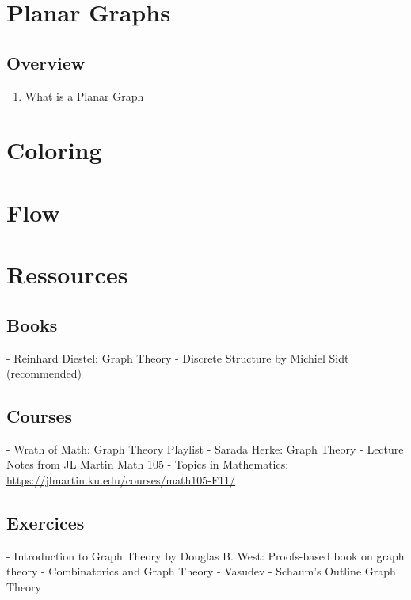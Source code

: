 \documentclass{article}
\begin{document}
\section{Planar Graphs}

\subsection{Overview}%
\label{sub:Overview}

\begin{enumerate}
    \item What is a Planar Graph
\end{enumerate}

\section{Coloring}
\section{Flow}

\section{Ressources}%
\label{sec:Ressources}

\subsection{Books}%
\label{sub:Books}

- Reinhard Diestel: Graph Theory
- Discrete Structure by Michiel Sidt (recommended)

\subsection{Courses}%
\label{sub:Courses}

- Wrath of Math: Graph Theory Playlist
- Sarada Herke: Graph Theory
- Lecture Notes from JL Martin Math 105 - Topics in Mathematics:
\url{https://jlmartin.ku.edu/courses/math105-F11/}

\subsection{Exercices}%
\label{sub:Exercices}

- Introduction to Graph Theory by Douglas B. West: Proofs-based book on
graph theory
- Combinatorics and Graph Theory - Vasudev
- Schaum's Outline Graph Theory
\end{document}
